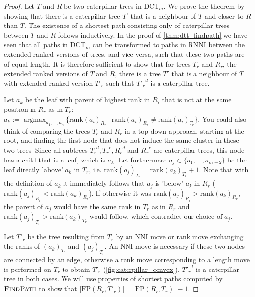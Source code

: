 \documentclass[11pt]{amsart}
\newcommand{\rnni}{\mathrm{RNNI}}
\newcommand{\findpath}{\textsc{FindPath}}
\newcommand{\rank}{\mathrm{rank}}
\newcommand{\nni}{\mathrm{NNI}}
\newcommand{\fp}{\mathrm{FP}}
\newcommand{\dct}{\mathrm{DCT}}
\DeclareMathOperator*{\argmax}{argmax}
\begin{document}
\begin{proof}
	Let $T$ and $R$ be two caterpillar trees in $\dct_m$.
	We prove the theorem by showing that there is a caterpillar tree $T'$ that is a neighbour of $T$ and closer to $R$ than $T$.
	The existence of a shortest path consisting only of caterpillar trees between $T$ and $R$ follows inductively.
	In the proof of \autoref{thm:dtt_findpath} we have seen that all paths in $\dct_m$ can be transformed to paths in $\rnni$ between the extended ranked versions of trees, and vice versa, such that these two paths are of equal length.
	It is therefore sufficient to show that for trees $T_r$ and $R_r$, the extended ranked versions of $T$ and $R$, there is a tree $T'$ that is a neighbour of $T$ with extended ranked version $T'_r$ such that ${T'_r}^d$ is a caterpillar tree.

	Let $a_k$ be the leaf with parent of highest rank in $R_r$ that is not at the same position in $R_r$ as in $T_r$: $a_k := \argmax_{a_1, \ldots, a_n}\{\rank(a_i)_{R_r} \ |\  \rank(a_i)_{R_r} \neq \rank(a_i)_{T_r}\}$.
	You could also think of comparing the trees $T_r$ and $R_r$ in a top-down approach, starting at the root, and finding the first node that does not induce the same cluster in these two trees.
	Since all subtrees ${T_r}^d, {T_r}^c, {R_r}^d$ and ${R_r}^c$ are caterpillar trees, this node has a child that is a leaf, which is $a_k$.
	Let furthermore $a_j \in \{a_1, \ldots, a_{m+2}\}$ be the leaf directly 'above' $a_k$ in $T_r$, i.e. $\rank(a_j)_{T_r} = \rank(a_k)_{T_r} + 1$.
	Note that with the definition of $a_k$ it immediately follows that $a_j$ is 'below' $a_k$ in $R_r$ ($\rank(a_j)_{R_r} < \rank(a_k)_{R_r}$).
	If otherwise it was $\rank(a_j)_{R_r} > \rank(a_k)_{R_r}$, the parent of $a_j$ would have the same rank in $T_r$ as in $R_r$ and $\rank(a_j)_{T_r} > \rank(a_k)_{T_r}$ would follow, which contradict our choice of $a_j$.
 
	Let $T'_r$ be the tree resulting from $T_r$ by an $\nni$ move or rank move exchanging the ranks of $(a_k)_{T_r}$ and $(a_j)_{T_r}$.
	An $\nni$ move is necessary if these two nodes are connected by an edge, otherwise a rank move corresponding to a length move is performed on $T_r$ to obtain $T'_r$ (\autoref{fig:caterpillar_convex}).
	${T'_r}^d$ is a caterpillar tree in both cases.
	We will use properties of shortest paths computed by $\findpath$ to show that $|\fp(R_r,T'_r)| = |\fp(R_r,T_r)| - 1$.


\end{proof}
\end{document}
